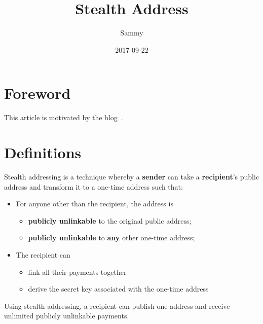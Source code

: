 \documentclass[a4paper,10pt]{article}
\title{Stealth Address}
\author{Sammy}
\date{2017-09-22}
\begin{document}
\maketitle

\section{Foreword}
This article is motivated by the blog~\cite{stealth-address-luigi111}.
\section{Definitions}
Stealth addressing is a technique whereby a \textbf{sender} can take a \textbf{recipient}'s public address and transform it to a one-time address such that:
	\begin{itemize}
		\item For anyone other than the recipient, the address is
			\begin{itemize}
				\item \textbf{publicly unlinkable} to the original public address;
				\item \textbf{publicly unlinkable} to \textbf{any} other one-time address;
			\end{itemize}
		\item The recipient can
			\begin{itemize}
				\item link all their payments together 
				\item derive the secret key associated with the one-time address
			\end{itemize}
	\end{itemize}
Using stealth addressing, a recipient can publish one address and receive unlimited publicly unlinkable payments.
\end{document}
